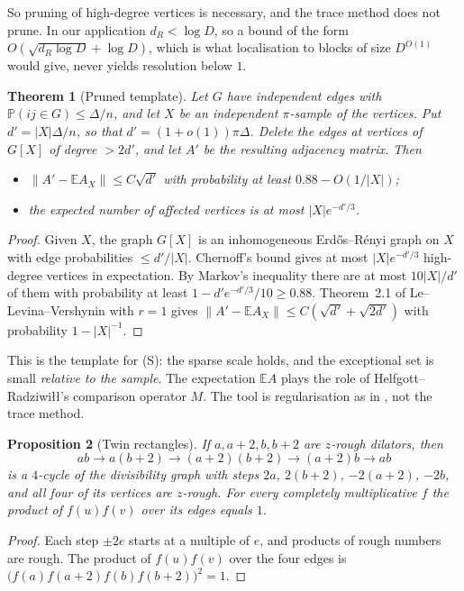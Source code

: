 \documentclass[11pt]{amsart}
\newtheorem{theorem}{Theorem}[section]
\newtheorem{proposition}[theorem]{Proposition}
\theoremstyle{definition}
\theoremstyle{remark}
\newcommand{\E}{\mathbb{E}}
\begin{document}
So pruning of high-degree vertices is necessary, and the trace method does not prune. In our application $d_R<\log D$, so a bound of the form $O(\sqrt{d_R\log D}+\log D)$, which is what localisation to blocks of size $D^{O(1)}$ would give, never yields resolution below $1$.

\begin{theorem}[Pruned template]\label{thm:pruned}
Let $G$ have independent edges with $\mathbb P(ij\in G)\le\Delta/n$, and let $X$ be an independent $\pi$-sample of the vertices. Put $d'=|X|\Delta/n$, so that $d'=(1+o(1))\pi\Delta$. Delete the edges at vertices of $G[X]$ of degree $>2d'$, and let $A'$ be the resulting adjacency matrix. Then
\begin{itemize}
\item $\|A'-\E A_X\|\le C\sqrt{d'}$ with probability at least $0.88-O(1/|X|)$;
\item the expected number of affected vertices is at most $|X|e^{-d'/3}$.
\end{itemize}
\end{theorem}
\begin{proof}
Given $X$, the graph $G[X]$ is an inhomogeneous Erd\H{o}s--R\'enyi graph on $X$ with edge probabilities $\le d'/|X|$. Chernoff's bound gives at most $|X|e^{-d'/3}$ high-degree vertices in expectation. By Markov's inequality there are at most $10|X|/d'$ of them with probability at least $1-d'e^{-d'/3}/10\ge0.88$. Theorem~2.1 of Le--Levina--Vershynin \cite{LLV17} with $r=1$ gives $\|A'-\E A_X\|\le C(\sqrt{d'}+\sqrt{2d'})$ with probability $1-|X|^{-1}$.
\end{proof}

This is the template for (S): the sparse scale holds, and the exceptional set is small \emph{relative to the sample}. The expectation $\E A$ plays the role of Helfgott--Radziwi\l{}\l{}'s comparison operator $M$. The tool is regularisation as in \cite{LLV17,FO05}, not the trace method.

\begin{proposition}[Twin rectangles]\label{prop:rectangles}
If $a,a+2,b,b+2$ are $z$-rough dilators, then
\[
ab\to a(b+2)\to(a+2)(b+2)\to(a+2)b\to ab
\]
is a $4$-cycle of the divisibility graph with steps $2a$, $2(b+2)$, $-2(a+2)$, $-2b$, and all four of its vertices are $z$-rough. For every completely multiplicative $f$ the product of $f(u)f(v)$ over its edges equals $1$.
\end{proposition}
\begin{proof}
Each step $\pm2e$ starts at a multiple of $e$, and products of rough numbers are rough. The product of $f(u)f(v)$ over the four edges is $\bigl(f(a)f(a+2)f(b)f(b+2)\bigr)^2=1$.
\end{proof}
\end{document}
